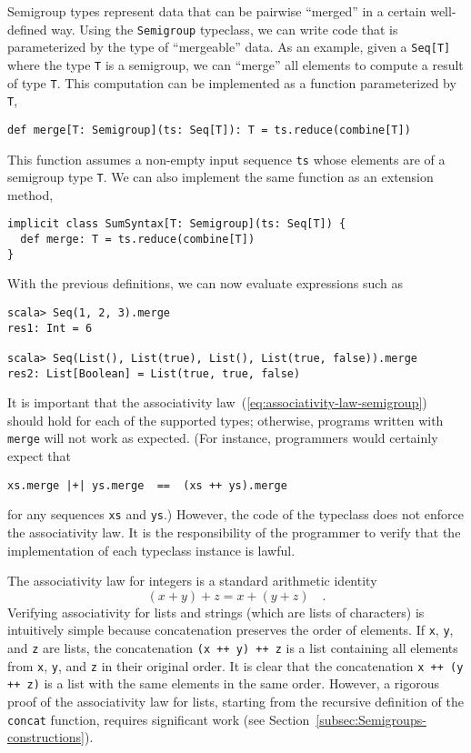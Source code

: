 Semigroup types represent data that can be pairwise ``merged'' in
a certain well-defined way. Using the \lstinline!Semigroup! typeclass,
we can write code that is parameterized by the type of ``mergeable''
data. As an example, given a \lstinline!Seq[T]! where the type \lstinline!T!
is a semigroup, we can ``merge'' all elements to compute a result
of type \lstinline!T!. This computation can be implemented as a function
parameterized by \lstinline!T!,
\begin{lstlisting}
def merge[T: Semigroup](ts: Seq[T]): T = ts.reduce(combine[T])
\end{lstlisting}
This function assumes a non-empty input sequence \lstinline!ts! whose
elements are of a semigroup type \lstinline!T!. We can also implement
the same function as an extension method,
\begin{lstlisting}
implicit class SumSyntax[T: Semigroup](ts: Seq[T]) {
  def merge: T = ts.reduce(combine[T])
}
\end{lstlisting}
With the previous definitions, we can now evaluate expressions such
as
\begin{lstlisting}
scala> Seq(1, 2, 3).merge
res1: Int = 6

scala> Seq(List(), List(true), List(), List(true, false)).merge
res2: List[Boolean] = List(true, true, false)
\end{lstlisting}

It is important that the associativity law~(\ref{eq:associativity-law-semigroup})
should hold for each of the supported types; otherwise, programs written
with \lstinline!merge! will not work as expected. (For instance,
programmers would certainly expect that 
\begin{lstlisting}
xs.merge |+| ys.merge  ==  (xs ++ ys).merge
\end{lstlisting}
for any sequences \lstinline!xs! and \lstinline!ys!.) However, the
code of the typeclass does not enforce the associativity law. It is
the responsibility of the programmer to verify that the implementation
of each typeclass instance is lawful. 

The associativity law for integers is a standard arithmetic identity
\[
\left(x+y\right)+z=x+\left(y+z\right)\quad.
\]
Verifying associativity for lists and strings (which are lists of
characters) is intuitively simple because concatenation preserves
the order of elements. If \lstinline!x!, \lstinline!y!, and \lstinline!z!
are lists, the concatenation \lstinline!(x ++ y) ++ z! is a list
containing all elements from \lstinline!x!, \lstinline!y!, and \lstinline!z!
in their original order. It is clear that the concatenation \lstinline!x ++ (y ++ z)!
is a list with the same elements in the same order. However, a rigorous
proof of the associativity law for lists, starting from the recursive
definition of the \lstinline!concat! function, requires significant
work (see Section~\ref{subsec:Semigroups-constructions}). 


